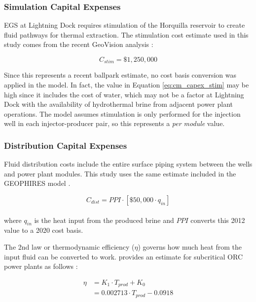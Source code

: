 \subsubsection{Simulation Capital Expenses}
\label{ch4:cm_stim}

EGS at Lightning Dock requires stimulation of the Horquilla reservoir to create fluid pathways for thermal extraction. The stimulation cost estimate used in this study comes from the recent GeoVision analysis \citep{lowry_geovision_2017}:

\begin{equation}
\label{eq:cm_capex_stim}
    C_{stim} = \$1,250,000
\end{equation}

Since this represents a recent ballpark estimate, no cost basis conversion was applied in the model. In fact, the value in Equation \ref{eq:cm_capex_stim} may be high since it includes the cost of water, which may not be a factor at Lightning Dock with the availability of hydrothermal brine from adjacent power plant operations. The model assumes stimulation is only performed for the injection well in each injector-producer pair, so this represents a \textit{per module} value.

\subsubsection{Distribution Capital Expenses}
\label{ch4:cm_capex_dist}

Fluid distribution costs include the entire surface piping system between the wells and power plant modules. This study uses the same estimate included in the GEOPHIRES model \citep{beckers_introducing_2013}.

\begin{equation}
\label{eq:cm_dist}
    C_{dist} = PPI \cdot \left[ \$50,000 \cdot q_{in} \right]
\end{equation}
\\
where $q_{in}$ is the heat input from the produced brine and $PPI$ converts this 2012 value to a 2020 cost basis. 

The 2nd law or thermodynamic efficiency ($\eta$) governs how much heat from the input fluid can be converted to work. \citeauthor{beckers_low-temperature_2016} provides an estimate for subcritical ORC power plants as follows \citeyear[p.\ 39-41]{beckers_low-temperature_2016}:

\begin{equation}
\begin{aligned}
    \label{eq:2ndlaw_eff}
    \eta &= K_1 \cdot T_{prod} + K_0 \\
         &= 0.002713 \cdot T_{prod} - 0.0918
\end{aligned}
\end{equation}

